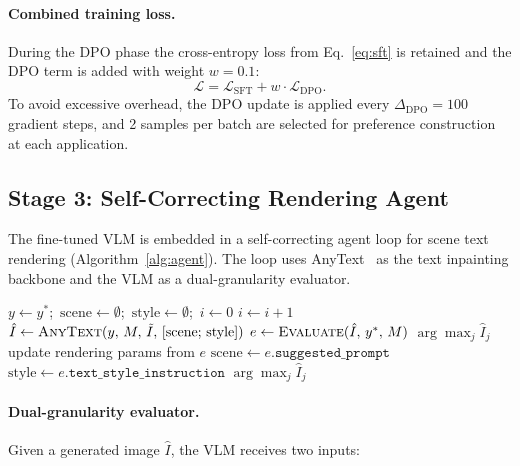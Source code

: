 \documentclass[uplatex,10pt,twocolumn,a4paper]{article}
\begin{document}
\paragraph{Combined training loss.}
During the DPO phase the cross-entropy loss from Eq.~\ref{eq:sft}
is retained and the DPO term is added with weight $w=0.1$:
\begin{equation}
  \mathcal{L} = \mathcal{L}_\mathrm{SFT} +
                w \cdot \mathcal{L}_\mathrm{DPO}.
  \label{eq:total}
\end{equation}
To avoid excessive overhead, the DPO update is applied every
$\Delta_\mathrm{DPO} = 100$ gradient steps, and 2 samples per batch
are selected for preference construction at each application.

\subsection{Stage 3: Self-Correcting Rendering Agent}
\label{sec:stage2}

The fine-tuned VLM is embedded in a self-correcting agent loop for
scene text rendering (Algorithm~\ref{alg:agent}).
The loop uses AnyText~\cite{anytext2023} as the text inpainting
backbone and the VLM as a dual-granularity evaluator.

\begin{algorithm}[t]
  \caption{TextCorrectionAgent.run($\tilde{I}$, $M$, $y^*$)}
  \label{alg:agent}
  \begin{algorithmic}[1]
    \STATE $y \leftarrow y^*$;\ $\text{scene} \leftarrow \emptyset$;\
           $\text{style} \leftarrow \emptyset$;\ $i \leftarrow 0$
    \WHILE{$i < K$}
      \STATE $i \leftarrow i + 1$
      \STATE $\hat{I} \leftarrow \textsc{AnyText}(y,\, M,\, \tilde{I},\,
             [\text{scene};\, \text{style}])$
      \STATE $e \leftarrow \textsc{Evaluate}(\hat{I},\, y^*,\, M)$
             \COMMENT{Sec.~\ref{sec:evaluator}}
        \RETURN $\arg\max_j \hat{I}_j$
      \ENDIF
      \STATE update rendering params from $e$
        \STATE $\text{scene} \leftarrow e.\texttt{suggested\_prompt}$
      \ENDIF
      \STATE $\text{style} \leftarrow e.\texttt{text\_style\_instruction}$
    \ENDWHILE
    \RETURN $\arg\max_j \hat{I}_j$
  \end{algorithmic}
\end{algorithm}

\paragraph{Dual-granularity evaluator.}
\label{sec:evaluator}
Given a generated image $\hat{I}$, the VLM receives two inputs:
\end{document}
